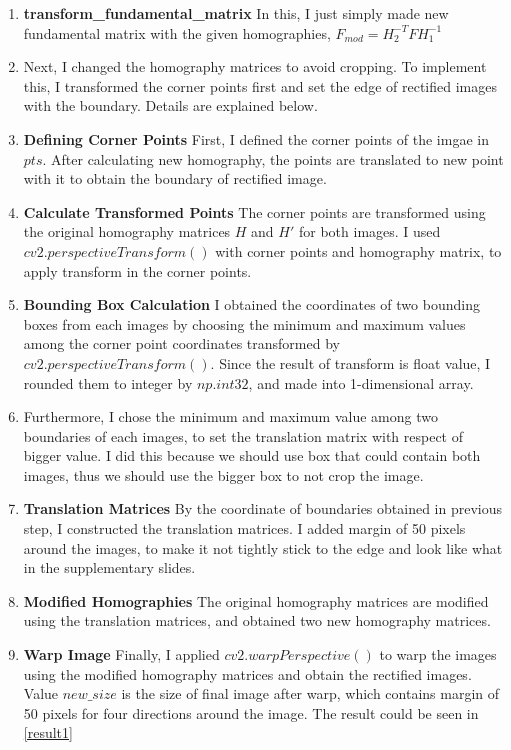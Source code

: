 \begin{enumerate}
    \item \textbf{transform\_fundamental\_matrix} In this, I just simply made new fundamental matrix with the given homographies, $F_{mod}=H_2^{-T}FH_1^{-1}$
    \item Next, I changed the homography matrices to avoid cropping. To implement this, I transformed the corner points first and set the edge of rectified images with the boundary. Details are explained below.
    \item \textbf{Defining Corner Points} First, I defined the corner points of the imgae in $pts$. After calculating new homography, the points are translated to new point with it to obtain the boundary of rectified image.
    
    \item \textbf{Calculate Transformed Points} The corner points are transformed using the original homography matrices $H$ and $H'$ for both images. I used $cv2.perspectiveTransform()$ with corner points and homography matrix, to apply transform in the corner points.

    \item \textbf{Bounding Box Calculation} I obtained the coordinates of two bounding boxes from each images by choosing the minimum and maximum values among the corner point coordinates transformed by $cv2.perspectiveTransform()$. Since the result of transform is float value, I rounded them to integer by $np.int32$, and made into 1-dimensional array.
    \item Furthermore, I chose the minimum and maximum value among two boundaries of each images, to set the translation matrix with respect of bigger value. I did this because we should use box that could contain both images, thus we should use the bigger box to not crop the image.
    \item \textbf{Translation Matrices} By the coordinate of boundaries obtained in previous step, I constructed the translation matrices. I added margin of 50 pixels around the images, to make it not tightly stick to the edge and look like what in the supplementary slides.
    \item \textbf{Modified Homographies} The original homography matrices are modified using the translation matrices, and obtained two new homography matrices.
    \item \textbf{Warp Image} Finally, I applied $cv2.warpPerspective()$ to warp the images using the modified homography matrices and obtain the rectified images. Value $new\_size$ is the size of final image after warp, which contains margin of 50 pixels for four directions around the image. The result could be seen in \ref*{result1}
    
\end{enumerate}
